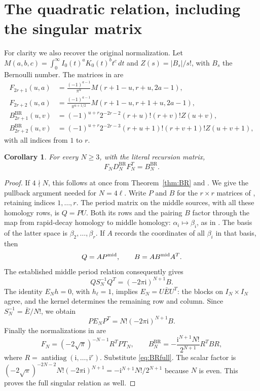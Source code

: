 \documentclass[11pt]{article}
\newtheorem{corollary}[theorem]{Corollary}
\theoremstyle{definition}
\newcommand{\BR}{\mathrm{BR}}
\numberwithin{equation}{section}
\begin{document}
\section{The quadratic relation, including the singular matrix}

For clarity we also recover the original normalization.
Let $M(a,b,c)=\int_0^\infty I_0(t)^aK_0(t)^bt^c\,dt$ and
$Z(s)=|B_s|/s!$, with $B_s$ the Bernoulli number.
The matrices in \cite[formulas (5.2)--(5.6)]{BR} are
\begin{align*}
 F_{2r+1}(u,a)&=\frac{(-1)^{a-1}}{\pi^u}
                  M(r+1-u,r+u,2a-1),\\
 F_{2r+2}(u,a)&=\frac{(-1)^{a-1}}{\pi^{u+1/2}}
                  M(r+1-u,r+1+u,2a-1),\\
 B_{2r+1}^{\BR}(u,v)&=(-1)^{u+r}2^{-2r-2}
                  (r+u)!(r+v)!Z(u+v),\\
 B_{2r+2}^{\BR}(u,v)&=(-1)^{u+r}2^{-2r-3}
                  (r+u+1)!(r+v+1)!Z(u+v+1),
\end{align*}
with all indices from $1$ to $r$.

\begin{corollary}\label{cor:quadratic}
For every $N\ge3$, with the literal recursion matrix,
\[
 F_ND_N^{\BR}F_N^T=B_N^{\BR}.
\]
\end{corollary}
\begin{proof}
If $4\nmid N$, this follows at once from Theorem~\ref{thm:BR} and
\cite[Corollary 5.10]{FSY}.
We give the pullback argument needed for $N=4\ell$.
Write $P$ and $B$ for the $r\times r$ matrices of
\cite[Sections 4--5]{FSY}, retaining indices $1,\ldots,r$.
The period matrix on the middle sources, with all these homology rows,
is $Q=PU$. Both its rows and the pairing $B$ factor through the map
from rapid-decay homology to middle homology:
$\alpha_i\mapsto\beta_i$, as in \cite[formula (4.5)]{FSY}.
The basis of the latter space is $\beta_2,\ldots,\beta_r$.
If $A$ records the coordinates of all $\beta_i$ in that basis, then
\[
 Q=AP^{\rm mid},\qquad B=AB^{\rm mid}A^T.
\]
The established middle period relation
\cite[Theorem 5.3]{FSY} consequently gives
\[
 QS_N^{-1}Q^T=(-2\pi\mathrm i)^{N+1}B.
\]
The identity $E_Nh=0$, with $h_\ell=1$, implies
$E_N=U\bar EU^T$: the blocks on $I_N\times I_N$ agree, and the
kernel determines the remaining row and column. Since
$S_N^{-1}=\bar E/N!$, we obtain
\[
 PE_NP^T=N!(-2\pi\mathrm i)^{N+1}B.
\]
Finally the normalizations in \cite[formula (5.9)]{FSY} are
\[
 F_N=(-2\sqrt\pi)^{-N-1}R^TPT_N,\qquad
 B_N^{\BR}=-\frac{\mathrm i^{N+1}N!}{2^{N+1}}R^TBR,
\]
where $R=\operatorname{antidiag}(\mathrm i,\ldots,\mathrm i^r)$.
Substitute \eqref{eq:BRfull}. The scalar factor is
$(-2\sqrt\pi)^{-2N-2}N!(-2\pi\mathrm i)^{N+1}
=-\mathrm i^{N+1}N!/2^{N+1}$ because $N$ is even.
This proves the full singular relation as well.
\end{proof}
\end{document}
